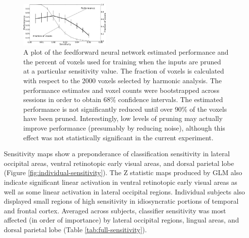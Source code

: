 \documentclass[5p,authoryear]{elsarticle}
\begin{document}
\begin{figure}
\centering
\includegraphics[width=0.4\textwidth]{figures/performance-verse-sensitivity-cutoff}
\caption{A plot of the feedforward neural network estimated performance and the percent of voxels used for training when the inputs are pruned at a particular sensitivity value.
The fraction of voxels is calculated with respect to the 2000 voxels selected by harmonic analysis.
The performance estimates and voxel counts were bootstrapped across sessions in order to obtain 68\% confidence intervals.
The estimated performance is not significantly reduced until over 90\% of the voxels have been pruned.
Interestingly, low levels of pruning may actually improve performance (presumably by reducing noise), although this effect was not statistically significant in the current experiment.} 
\label{fig:sensitivity-cutoff}
\end{figure}

Sensitivity maps show a preponderance of classification sensitivity in lateral occipital areas, ventral retinotopic early visual areas, and dorsal parietal lobe (Figure \ref{fig:individual-sensitivity}). 
The Z statistic maps produced by GLM also indicate significant linear activation in ventral retinotopic early visual areas as well as some linear activation in lateral occipital regions.
Individual subjects also displayed small regions of high sensitivity in idiosyncratic portions of temporal and frontal cortex. 
Averaged across subjects, classifier sensitivity was most affected (in order of importance) by lateral occipital regions, lingual areas, and dorsal parietal lobe (Table \ref{tab:full-sensitivity}). 
\end{document}
